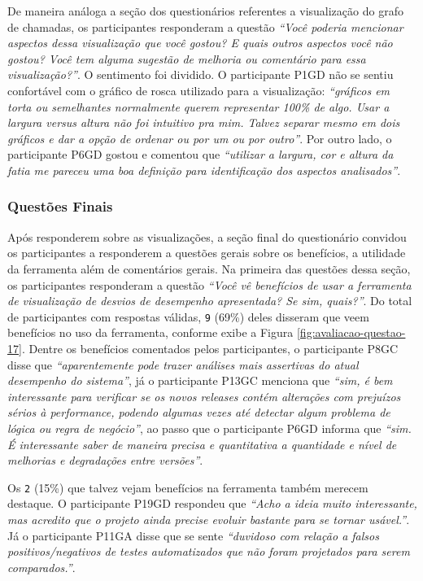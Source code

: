 De maneira análoga a seção dos questionários referentes a visualização do grafo de chamadas, os participantes responderam a questão \textit{``Você poderia mencionar aspectos dessa visualização que você gostou? E quais outros aspectos você não gostou? Você tem alguma sugestão de melhoria ou comentário para essa visualização?''}. O sentimento foi dividido. O participante P1GD não se sentiu confortável com o gráfico de rosca utilizado para a visualização: \textit{``gráficos em torta ou semelhantes normalmente querem representar 100\% de algo. Usar a largura versus altura não foi intuitivo pra mim. Talvez separar mesmo em dois gráficos e dar a opção de ordenar ou por um ou por outro''}. Por outro lado, o participante P6GD gostou e comentou que \textit{``utilizar a largura, cor e altura da fatia me pareceu uma boa definição para identificação dos aspectos analisados''}.

\subsubsection{Questões Finais}

Após responderem sobre as visualizações, a seção final do questionário convidou os participantes a responderem a questões gerais sobre os benefícios, a utilidade da ferramenta além de comentários gerais. Na primeira das questões dessa seção, os participantes responderam a questão \textit{``Você vê benefícios de usar a ferramenta de visualização de desvios de desempenho apresentada? Se sim, quais?''}. Do total de participantes com respostas válidas, \texttt{9} (69\%) deles disseram que veem benefícios no uso da ferramenta, conforme exibe a Figura \ref{fig:avaliacao-questao-17}. Dentre os benefícios comentados pelos participantes, o participante P8GC disse que \textit{``aparentemente pode trazer análises mais assertivas do atual desempenho do sistema''}, já o participante P13GC menciona que \textit{``sim, é bem interessante para verificar se os novos releases contém alterações com prejuízos sérios à performance, podendo algumas vezes até detectar algum problema de lógica ou regra de negócio''}, ao passo que o participante P6GD informa que \textit{``sim. É interessante saber de maneira precisa e quantitativa a quantidade e nível de melhorias e degradações entre versões''}.

Os \texttt{2} (15\%) que talvez vejam benefícios na ferramenta também merecem destaque. O participante P19GD respondeu que \textit{``Acho a ideia muito interessante, mas acredito que o projeto ainda precise evoluir bastante para se tornar usável.''}. Já o participante P11GA disse que se sente \textit{``duvidoso com relação a falsos positivos/negativos de testes automatizados que não foram projetados para serem comparados.''}.


